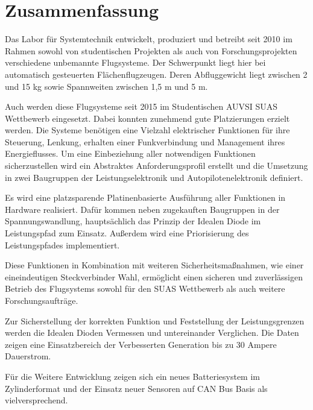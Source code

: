 \chapter*{Zusammenfassung}

Das Labor für Systemtechnik entwickelt, produziert und betreibt seit 2010 im Rahmen sowohl von studentischen Projekten als auch von Forschungsprojekten verschiedene unbemannte Flugsysteme.
Der Schwerpunkt liegt hier bei automatisch gesteuerten Flächenflugzeugen.
Deren Abfluggewicht liegt zwischen 2 und 15 kg sowie Spannweiten zwischen 1,5 m und 5 m.

Auch werden diese Flugsysteme seit 2015 im Studentischen AUVSI SUAS Wettbewerb eingesetzt. Dabei konnten zunehmend gute Platzierungen erzielt werden.
Die Systeme benötigen eine Vielzahl elektrischer Funktionen für ihre Steuerung, Lenkung, erhalten einer Funkverbindung und Management ihres Energieflusses.
Um eine Einbeziehung aller notwendigen Funktionen sicherzustellen wird ein Abstraktes Anforderungsprofil erstellt und die Umsetzung in zwei Baugruppen der Leistungselektronik und Autopilotenelektronik definiert.

Es wird eine platzsparende Platinenbasierte Ausführung aller Funktionen in Hardware realisiert. Dafür kommen neben zugekauften Baugruppen in der Spannungswandlung, hauptsächlich das Prinzip der Idealen Diode im Leistungspfad zum Einsatz. Außerdem wird eine Priorisierung des Leistungspfades implementiert.

Diese Funktionen in Kombination mit weiteren Sicherheitsmaßnahmen, wie einer eineindeutigen Steckverbinder Wahl, ermöglicht einen sicheren und zuverlässigen Betrieb des Flugsystems sowohl für den SUAS Wettbewerb als auch weitere Forschungsaufträge.

Zur Sicherstellung der korrekten Funktion und Feststellung der Leistungsgrenzen werden die Idealen Dioden Vermessen und untereinander Verglichen. Die Daten zeigen eine Einsatzbereich der Verbesserten Generation bis zu 30 Ampere Dauerstrom.

Für die Weitere Entwicklung zeigen sich ein neues Batteriesystem im Zylinderformat und der Einsatz neuer Sensoren auf CAN Bus Basis als vielversprechend.


